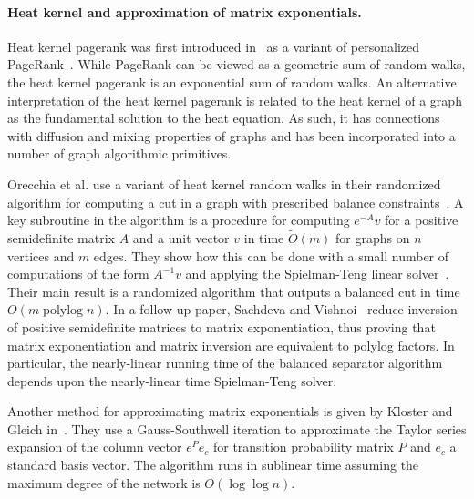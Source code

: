 \documentclass[runningheads,a4paper]{llncs}
\def\polylog{\operatorname{polylog}}
\begin{document}
\paragraph{Heat kernel and approximation of matrix exponentials.} Heat kernel
pagerank was first introduced in~\cite{chung:hkpr:07} as a variant of
personalized PageRank~\cite{haveliwala2002topic}.  While PageRank can be
viewed as a geometric sum of random walks, the heat kernel pagerank is an
exponential sum of random walks.  An alternative interpretation of the heat
kernel pagerank is related to the heat kernel of a graph as the fundamental
solution to the heat equation.  As such, it has connections with diffusion and
mixing properties of graphs and has been incorporated into a number of graph
algorithmic primitives.

Orecchia et al. use a variant of heat kernel random walks in their randomized
algorithm for computing a cut in a graph with prescribed balance
constraints~\cite{osv:balsep:11}.  A key subroutine in the algorithm is a
procedure for computing $e^{-A}v$ for a positive semidefinite matrix $A$ and a
unit vector $v$ in time $\tilde{O}(m)$ for graphs on $n$ vertices and $m$ edges.
They show how this can be done with a small number of computations of the form
$A^{-1}v$ and applying the Spielman-Teng linear
solver~\cite{st:graphpartitioning:stoc04}.  Their main result is a randomized
algorithm that outputs a balanced cut in time $O(m\polylog n)$.  In a follow up
paper, Sachdeva and Vishnoi~\cite{sachdeva2013matrix} reduce inversion of
positive semidefinite matrices to matrix exponentiation, thus proving that
matrix exponentiation and matrix inversion are equivalent to polylog factors.
In particular, the nearly-linear running time of the balanced separator
algorithm depends upon the nearly-linear time Spielman-Teng solver.

Another method for approximating matrix exponentials is given by Kloster and
Gleich in~\cite{kloster:columnexp:waw13}.  They use a Gauss-Southwell iteration
to approximate the Taylor series expansion of the column vector $e^{P}e_c$ for
transition probability matrix $P$ and $e_c$ a standard basis vector.  The
algorithm runs in sublinear time assuming the maximum degree of the network is
$O(\log\log n)$.
\end{document}
